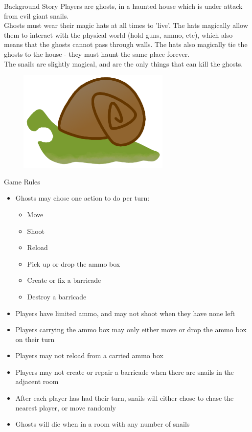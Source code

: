 \documentclass{beamer}
\begin{document}
\begin{frame}{Background Story}
  Players are ghosts, in a haunted house which is under attack from evil giant snails.\\
  Ghosts must wear their magic hats at all times to 'live'. The hats magically allow them to interact with the physical world (hold guns, ammo, etc), which also means that the ghosts cannot pass through walls. The hats also magically tie the ghosts to the house - they must haunt the same place forever.\\
  The snails are slightly magical, and are the only things that can kill the ghosts.\\
  \vspace{\baselineskip}
  \begin{figure}
    \hfill
    \includegraphics[scale=0.15]{snail_teeth_flip.png}
  \end{figure}
\end{frame}

\begin{frame}{Game Rules}
  \begin{itemize}
    \item Ghosts may chose one action to do per turn:
      \begin{itemize}
        \item Move
        \item Shoot
        \item Reload
        \item Pick up or drop the ammo box
        \item Create or fix a barricade
        \item Destroy a barricade
      \end{itemize}
    \item Players have limited ammo, and may not shoot when they have none left
    \item Players carrying the ammo box may only either move or drop the ammo box on their turn
    \item Players may not reload from a carried ammo box
    \item Players may not create or repair a barricade when there are snails in the adjacent room
    \item After each player has had their turn, snails will either chose to chase the nearest player, or move randomly
    \item Ghosts will die when in a room with any number of snails
  \end{itemize}
\end{frame}
\end{document}

